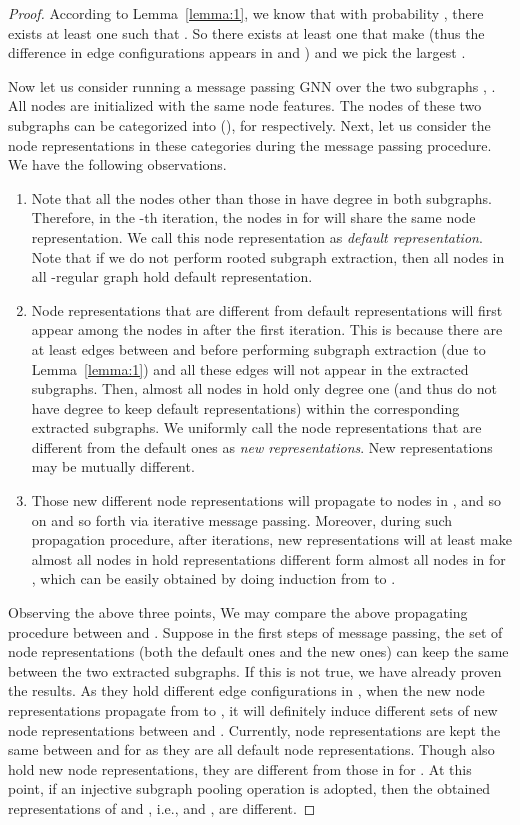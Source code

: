 \documentclass{article}
\begin{document}
\begin{proof}
According to Lemma~\ref{lemma:1}, we know that with probability , there exists at least one  such that . So there exists at least one  that make  (thus the difference in edge configurations appears in  and ) and we pick the largest .  

Now let us consider running a message passing GNN over the two subgraphs , . All nodes are initialized with the same node features. The nodes of these two subgraphs can be categorized into  (), for  respectively. Next, let us consider the node representations in these categories during the message passing procedure. We have the following observations.
\begin{enumerate}
    \item Note that all the nodes other than those in  have degree  in both subgraphs. Therefore, in the -th iteration, the nodes in  for  will share the same node representation. We call this node representation as \emph{default representation}. Note that if we do not perform rooted subgraph extraction, then all nodes in all -regular graph hold default representation.
    
    \item Node representations that are different from default representations will first appear among the nodes in  after the first iteration. This is because there are at least  edges between  and  before performing subgraph extraction (due to Lemma~\ref{lemma:1}) and all these edges will not appear in the extracted subgraphs. Then, almost all nodes in  hold only degree one (and thus do not have degree  to keep default representations) within the corresponding extracted subgraphs. We uniformly call the node representations that are different from the default ones as \emph{new representations}. New representations may be mutually different. 

    \item Those new different node representations will propagate to nodes in ,  and so on and so forth via iterative message passing. Moreover, during such propagation procedure, after  iterations, new representations will at least make almost all nodes in  hold representations different form almost all nodes in  for , which can be easily obtained by doing induction from  to . 
\end{enumerate}
Observing the above three points, We may compare the above propagating procedure between  and . Suppose in the first  steps of message passing, the set of node representations (both the default ones and the new ones) can keep the same between the two extracted subgraphs. If this is not true, we have already proven the results. As they hold different edge configurations in , when the new node representations propagate from  to , it will definitely induce different sets of new node representations between  and . Currently,  node representations are kept the same between   and  for  as they are all default node representations. Though   also hold new node representations, they are different from those in    for . At this point, if an injective subgraph pooling operation is adopted, then the obtained representations of  and , i.e.,  and , are different. 
\end{proof}
\end{document}
